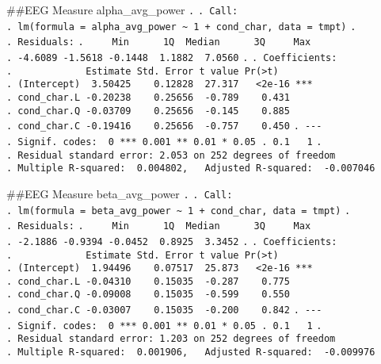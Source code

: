 \documentclass[
]{article}
\begin{document}
\#\#EEG Measure alpha\_avg\_power \texttt{.} \texttt{.\ Call:}
\texttt{.\ lm(formula\ =\ alpha\_avg\_power\ \textasciitilde{}\ 1\ +\ cond\_char,\ data\ =\ tmpt)}
\texttt{.} \texttt{.\ Residuals:}
\texttt{.\ \ \ \ \ Min\ \ \ \ \ \ 1Q\ \ Median\ \ \ \ \ \ 3Q\ \ \ \ \ Max}
\texttt{.\ -4.6089\ -1.5618\ -0.1448\ \ 1.1882\ \ 7.0560} \texttt{.}
\texttt{.\ Coefficients:}
\texttt{.\ \ \ \ \ \ \ \ \ \ \ \ \ Estimate\ Std.\ Error\ t\ value\ Pr(\textgreater{}\textbar{}t\textbar{})}
\texttt{.\ (Intercept)\ \ 3.50425\ \ \ \ 0.12828\ \ 27.317\ \ \ \textless{}2e-16\ ***}
\texttt{.\ cond\_char.L\ -0.20238\ \ \ \ 0.25656\ \ -0.789\ \ \ \ 0.431}
\texttt{.\ cond\_char.Q\ -0.03709\ \ \ \ 0.25656\ \ -0.145\ \ \ \ 0.885}
\texttt{.\ cond\_char.C\ -0.19416\ \ \ \ 0.25656\ \ -0.757\ \ \ \ 0.450}
\texttt{.\ -\/-\/-}
\texttt{.\ Signif.\ codes:\ \ 0\ \textquotesingle{}***\textquotesingle{}\ 0.001\ \textquotesingle{}**\textquotesingle{}\ 0.01\ \textquotesingle{}*\textquotesingle{}\ 0.05\ \textquotesingle{}.\textquotesingle{}\ 0.1\ \textquotesingle{}\ \textquotesingle{}\ 1}
\texttt{.}
\texttt{.\ Residual\ standard\ error:\ 2.053\ on\ 252\ degrees\ of\ freedom}
\texttt{.\ Multiple\ R-squared:\ \ 0.004802,\ \ \ Adjusted\ R-squared:\ \ -0.007046}

\#\#EEG Measure beta\_avg\_power \texttt{.} \texttt{.\ Call:}
\texttt{.\ lm(formula\ =\ beta\_avg\_power\ \textasciitilde{}\ 1\ +\ cond\_char,\ data\ =\ tmpt)}
\texttt{.} \texttt{.\ Residuals:}
\texttt{.\ \ \ \ \ Min\ \ \ \ \ \ 1Q\ \ Median\ \ \ \ \ \ 3Q\ \ \ \ \ Max}
\texttt{.\ -2.1886\ -0.9394\ -0.0452\ \ 0.8925\ \ 3.3452} \texttt{.}
\texttt{.\ Coefficients:}
\texttt{.\ \ \ \ \ \ \ \ \ \ \ \ \ Estimate\ Std.\ Error\ t\ value\ Pr(\textgreater{}\textbar{}t\textbar{})}
\texttt{.\ (Intercept)\ \ 1.94496\ \ \ \ 0.07517\ \ 25.873\ \ \ \textless{}2e-16\ ***}
\texttt{.\ cond\_char.L\ -0.04310\ \ \ \ 0.15035\ \ -0.287\ \ \ \ 0.775}
\texttt{.\ cond\_char.Q\ -0.09008\ \ \ \ 0.15035\ \ -0.599\ \ \ \ 0.550}
\texttt{.\ cond\_char.C\ -0.03007\ \ \ \ 0.15035\ \ -0.200\ \ \ \ 0.842}
\texttt{.\ -\/-\/-}
\texttt{.\ Signif.\ codes:\ \ 0\ \textquotesingle{}***\textquotesingle{}\ 0.001\ \textquotesingle{}**\textquotesingle{}\ 0.01\ \textquotesingle{}*\textquotesingle{}\ 0.05\ \textquotesingle{}.\textquotesingle{}\ 0.1\ \textquotesingle{}\ \textquotesingle{}\ 1}
\texttt{.}
\texttt{.\ Residual\ standard\ error:\ 1.203\ on\ 252\ degrees\ of\ freedom}
\texttt{.\ Multiple\ R-squared:\ \ 0.001906,\ \ \ Adjusted\ R-squared:\ \ -0.009976}
\end{document}
